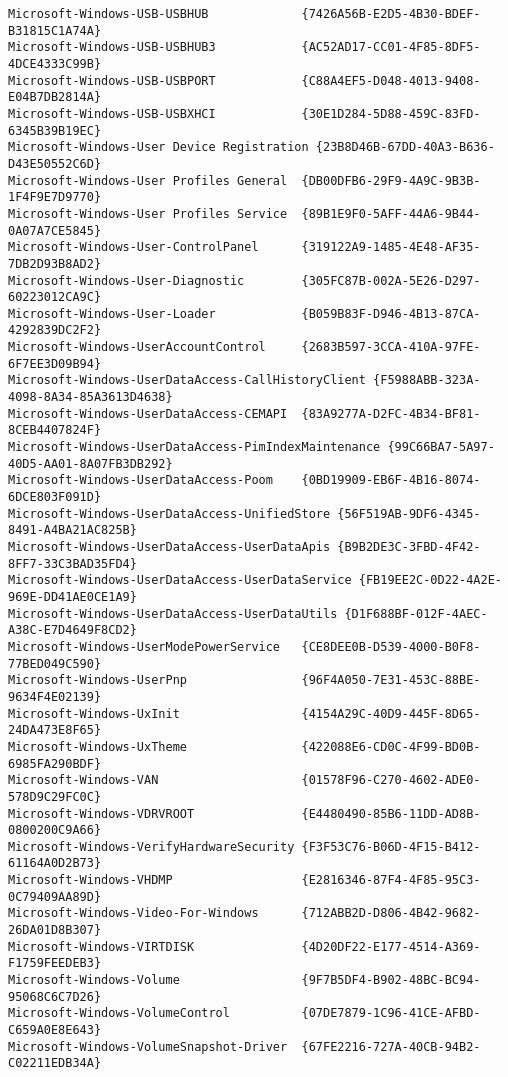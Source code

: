 \documentclass{report}
\begin{document}
\begin{lstlisting}[breaklines=true,basicstyle=\tiny]
Microsoft-Windows-USB-USBHUB             {7426A56B-E2D5-4B30-BDEF-B31815C1A74A}
Microsoft-Windows-USB-USBHUB3            {AC52AD17-CC01-4F85-8DF5-4DCE4333C99B}
Microsoft-Windows-USB-USBPORT            {C88A4EF5-D048-4013-9408-E04B7DB2814A}
Microsoft-Windows-USB-USBXHCI            {30E1D284-5D88-459C-83FD-6345B39B19EC}
Microsoft-Windows-User Device Registration {23B8D46B-67DD-40A3-B636-D43E50552C6D}
Microsoft-Windows-User Profiles General  {DB00DFB6-29F9-4A9C-9B3B-1F4F9E7D9770}
Microsoft-Windows-User Profiles Service  {89B1E9F0-5AFF-44A6-9B44-0A07A7CE5845}
Microsoft-Windows-User-ControlPanel      {319122A9-1485-4E48-AF35-7DB2D93B8AD2}
Microsoft-Windows-User-Diagnostic        {305FC87B-002A-5E26-D297-60223012CA9C}
Microsoft-Windows-User-Loader            {B059B83F-D946-4B13-87CA-4292839DC2F2}
Microsoft-Windows-UserAccountControl     {2683B597-3CCA-410A-97FE-6F7EE3D09B94}
Microsoft-Windows-UserDataAccess-CallHistoryClient {F5988ABB-323A-4098-8A34-85A3613D4638}
Microsoft-Windows-UserDataAccess-CEMAPI  {83A9277A-D2FC-4B34-BF81-8CEB4407824F}
Microsoft-Windows-UserDataAccess-PimIndexMaintenance {99C66BA7-5A97-40D5-AA01-8A07FB3DB292}
Microsoft-Windows-UserDataAccess-Poom    {0BD19909-EB6F-4B16-8074-6DCE803F091D}
Microsoft-Windows-UserDataAccess-UnifiedStore {56F519AB-9DF6-4345-8491-A4BA21AC825B}
Microsoft-Windows-UserDataAccess-UserDataApis {B9B2DE3C-3FBD-4F42-8FF7-33C3BAD35FD4}
Microsoft-Windows-UserDataAccess-UserDataService {FB19EE2C-0D22-4A2E-969E-DD41AE0CE1A9}
Microsoft-Windows-UserDataAccess-UserDataUtils {D1F688BF-012F-4AEC-A38C-E7D4649F8CD2}
Microsoft-Windows-UserModePowerService   {CE8DEE0B-D539-4000-B0F8-77BED049C590}
Microsoft-Windows-UserPnp                {96F4A050-7E31-453C-88BE-9634F4E02139}
Microsoft-Windows-UxInit                 {4154A29C-40D9-445F-8D65-24DA473E8F65}
Microsoft-Windows-UxTheme                {422088E6-CD0C-4F99-BD0B-6985FA290BDF}
Microsoft-Windows-VAN                    {01578F96-C270-4602-ADE0-578D9C29FC0C}
Microsoft-Windows-VDRVROOT               {E4480490-85B6-11DD-AD8B-0800200C9A66}
Microsoft-Windows-VerifyHardwareSecurity {F3F53C76-B06D-4F15-B412-61164A0D2B73}
Microsoft-Windows-VHDMP                  {E2816346-87F4-4F85-95C3-0C79409AA89D}
Microsoft-Windows-Video-For-Windows      {712ABB2D-D806-4B42-9682-26DA01D8B307}
Microsoft-Windows-VIRTDISK               {4D20DF22-E177-4514-A369-F1759FEEDEB3}
Microsoft-Windows-Volume                 {9F7B5DF4-B902-48BC-BC94-95068C6C7D26}
Microsoft-Windows-VolumeControl          {07DE7879-1C96-41CE-AFBD-C659A0E8E643}
Microsoft-Windows-VolumeSnapshot-Driver  {67FE2216-727A-40CB-94B2-C02211EDB34A}

\end{lstlisting}
\end{document}
